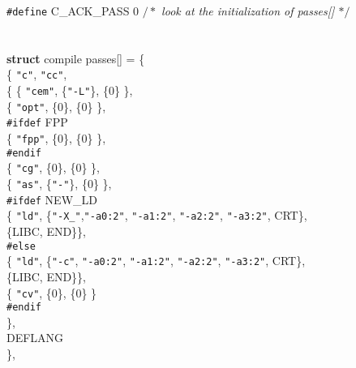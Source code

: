 \begin{flushleft}
{\tt \#define} C\_ACK\_PASS 0 {$/\ast$\it{} look at the initialization of passes[] $\ast/$}\mbox{}\\
\mbox{}\\
\hspace*{6\indentation}\mbox{}\\
{\bf struct} compile passes[] = \{\mbox{}\\
\{  {\tt"c"}, {\tt"cc"}, \mbox{}\\
\hspace*{3\indentation}\{  \{ {\tt"cem"}, \{{\tt"-L"}\}, \{0\} \},\mbox{}\\
\hspace*{6\indentation}\{ {\tt"opt"}, \{0\}, \{0\} \},\mbox{}\\
{\tt \#ifdef} FPP\mbox{}\\
\hspace*{6\indentation}\{ {\tt"fpp"}, \{0\}, \{0\} \},\mbox{}\\
{\tt \#endif}\mbox{}\\
\hspace*{6\indentation}\{ {\tt"cg"}, \{0\}, \{0\} \},\mbox{}\\
\hspace*{6\indentation}\{ {\tt"as"}, \{{\tt"-"}\}, \{0\} \},\mbox{}\\
{\tt \#ifdef} NEW\_LD\mbox{}\\
\hspace*{6\indentation}\{ {\tt"ld"}, \{{\tt"-X\_"},{\tt"-a0:2"}, {\tt"-a1:2"}, {\tt"-a2:2"}, {\tt"-a3:2"}, CRT\},\mbox{}\\
\hspace*{9\indentation}\{LIBC, END\}\},\mbox{}\\
{\tt \#else}\mbox{}\\
\hspace*{6\indentation}\{ {\tt"ld"}, \{{\tt"-c"}, {\tt"-a0:2"}, {\tt"-a1:2"}, {\tt"-a2:2"}, {\tt"-a3:2"}, CRT\}, \mbox{}\\
\hspace*{11\indentation}\{LIBC, END\}\},\mbox{}\\
\hspace*{6\indentation}\{ {\tt"cv"}, \{0\}, \{0\} \}\mbox{}\\
{\tt \#endif}\mbox{}\\
\hspace*{3\indentation}\},\mbox{}\\
\hspace*{3\indentation}DEFLANG\mbox{}\\
\},\mbox{}\\

\end{flushleft}
